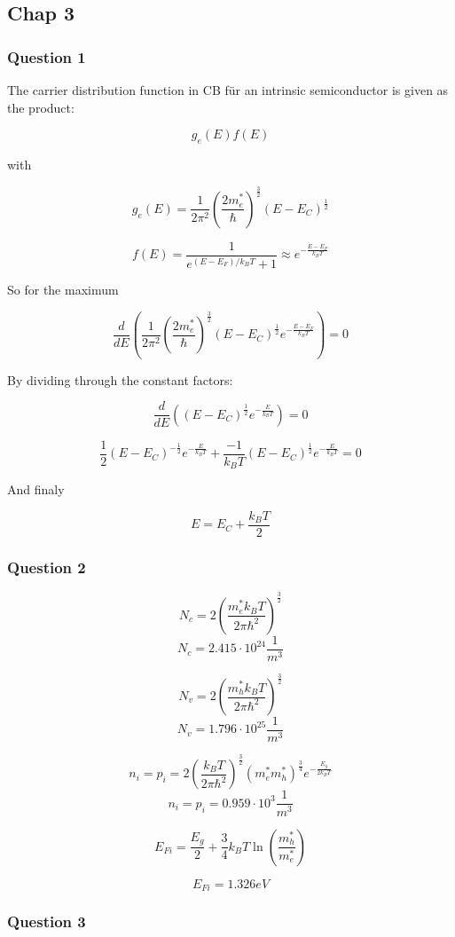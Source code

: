 \subsection{Chap 3} \label{chap3}

\subsubsection*{Question 1}
The carrier distribution function in CB für an intrinsic semiconductor
is given as the product:

$$g_e(E) f(E)$$

with

$$g_e(E) = \frac{1}{2\pi^2} \left( \frac{2m_e^*}{\hbar} \right)^\frac{3}{2} (E-E_C)^\frac{1}{2}$$

$$f(E) = \frac{1}{e^{(E-E_F)/k_BT}+1}  \approx e^{-\frac{E-E_F}{k_BT}}$$

So for the maximum 

$$\frac{d}{dE} \left(\frac{1}{2\pi^2} \left( \frac{2m_e^*}{\hbar} \right)^\frac{3}{2} (E-E_C)^\frac{1}{2} e^{-\frac{E-E_F}{k_BT}} \right) = 0$$

By dividing through the constant factors:

$$\frac{d}{dE} \left( (E-E_C)^\frac{1}{2} e^{-\frac{E}{k_BT}} \right) = 0$$

$$\frac{1}{2} (E-E_C)^{-\frac{1}{2}} e^{-\frac{E}{k_BT}} + \frac{-1}{k_BT} (E-E_C)^\frac{1}{2} e^{-\frac{E}{k_BT}} = 0$$

And finaly

$$E = E_C + \frac{k_BT}{2}$$


\subsubsection*{Question 2}

$$ N_c = 2 \left( \frac{m_e^*k_BT}{2\pi\hbar^2}\right)^{\frac{3}{2}}$$
$$ N_c = 2.415 \cdot 10^{24} \frac{1}{m^3}$$

$$ N_v = 2 \left( \frac{m_h^*k_BT}{2\pi\hbar^2}\right)^{\frac{3}{2}}$$
$$ N_v = 1.796 \cdot 10^{25} \frac{1}{m^3}$$

$$n_i = p_i = 2 \left( \frac{k_BT}{2\pi\hbar^2} \right)^{\frac{3}{2}}
  (m_e^*m_h^*)^{\frac{3}{4}} e^{-\frac{E_g}{2k_BT}}$$
$$n_i = p_i = 0.959 \cdot 10^3 \frac{1}{m^3}$$

$$E_{Fi} = \frac{E_g}{2} + \frac{3}{4} k_B T \ln\left( \frac{m_h^*}{m_e^*} \right)$$

$$E_{Fi} = 1.326 eV$$


\subsubsection*{Question 3}

